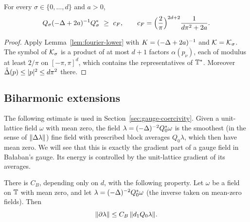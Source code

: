 \begin{corollary}\label{cor:QKQ-lower}
For every $\sigma\in\{0,\dots,d\}$ and $a>0$,
\[
Q_\sigma(-\Lap+2a)^{-1}Q_\sigma^*\ \ge\ c_F,\qquad c_F=\Big(\frac2\pi\Big)^{2d+2}\frac1{d\pi^2+2a}.
\]
\end{corollary}

\begin{proof}
Apply Lemma~\ref{lem:fourier-lower} with $K=(-\Delta+2a)^{-1}$ and $\mathcal K=\mathcal K_\sigma$. The symbol of $\mathcal K_\sigma$ is a product of at most $d+1$ factors $\alpha(p_\nu)$, each of modulus at least $2/\pi$ on $[-\pi,\pi]^d$, which contains the representatives of $\mathbb T^*$. Moreover $\hat{\Delta}(p)\le|p|^2\le d\pi^2$ there.
\end{proof}

\subsection{Biharmonic extensions}

The following estimate is used in Section~\ref{sec:gauge-coercivity}. Given a unit-lattice field $\omega$ with mean zero, the field $\lambda=(-\Delta)^{-2}Q_0^*\omega$ is the smoothest (in the sense of $\|\Delta\lambda\|$) fine field with prescribed block averages $Q_0\lambda$, which then have mean zero. We will see that this is exactly the gradient part of a gauge field in Ba\l aban's gauge. Its energy is controlled by the unit-lattice gradient of its averages.

\begin{lemma}\label{lem:biharmonic}
There is $C_B$, depending only on $d$, with the following property. Let $\omega$ be a field on $\mathbb T$ with mean zero, and let $\lambda=(-\Delta)^{-2}Q_0^*\omega$ (the inverse taken on mean-zero fields). Then
\[
\|\partial\lambda\|\le C_B\,\|d_1 Q_0\lambda\| .
\]
\end{lemma}

